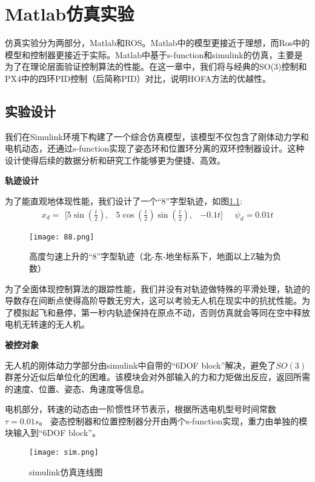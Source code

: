 \chapter{Matlab仿真实验}
仿真实验分为两部分，Matlab和ROS。Matlab中的模型更接近于理想，而Ros中的模型和控制器更接近于实际。Matlab中基于s-function和simulink的仿真，主要是为了在理论层面验证控制算法的性能。在这一章中，我们将与经典的SO(3)控制和PX4中的四环PID控制（后简称PID）对比，说明HOFA方法的优越性。



\section{实验设计}
我们在Simulink环境下构建了一个综合仿真模型，该模型不仅包含了刚体动力学和电机动态，还通过s-function实现了姿态环和位置环分离的双环控制器设计。这种设计使得后续的数据分析和研究工作能够更为便捷、高效。

\textbf{轨迹设计}

为了能直观地体现性能，我们设计了一个“8”字型轨迹，如图\ref{fig:8}:
$$x_d = \begin{matrix}[5\sin(\frac{t}{2}), & 5\cos(\frac{t}{2})\sin(\frac{t}{2}), &-0.1t]\end{matrix}
\quad
\psi_d=0.01t$$

\begin{figure}[!h]
  \centering
  \texttt{[image: 88.png]}
  \caption{高度匀速上升的“8”字型轨迹（北-东-地坐标系下，地面以上Z轴为负数）}
  \label{fig:8}
\end{figure}

为了全面体现控制算法的跟踪性能，我们并没有对轨迹做特殊的平滑处理，轨迹的导数存在间断点使得高阶导数无穷大，这可以考验无人机在现实中的抗扰性能。为了模拟起飞和悬停，第一秒内轨迹保持在原点不动，否则仿真就会等同在空中释放电机无转速的无人机。

\textbf{被控对象}

  无人机的刚体动力学部分由simulink中自带的“6DOF block”解决，避免了$SO(3)$群差分近似后单位化的困难。该模块会对外部输入的力和力矩做出反应，返回所需的速度、位置、姿态、角速度等信息。

  电机部分，转速的动态由一阶惯性环节表示，根据所选电机型号时间常数$\tau=0.01s$。
  姿态控制器和位置控制器分开由两个s-function实现，重力由单独的模块输入到“6DOF block”。
  \begin{figure}[!h]
    \centering
    \texttt{[image: sim.png]}
    \caption{simulink仿真连线图}
    \label{fig:sim}
  \end{figure}

